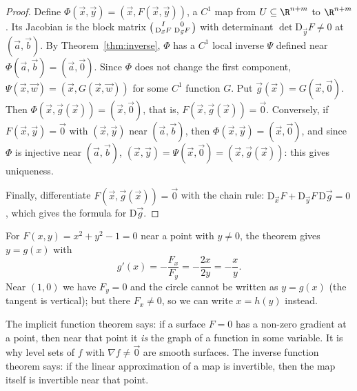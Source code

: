 \begin{proof}
Define $\Phi(\vec x,\vec y)=(\vec x,F(\vec x,\vec y))$, a $C^1$ map from $U\subseteq\R^{n+m}$ to $\R^{n+m}$. Its Jacobian is the block matrix $\begin{psmallmatrix}I&0\\\mathrm{D}_{\vec x}F&\mathrm{D}_{\vec y}F\end{psmallmatrix}$ with determinant $\det\mathrm{D}_{\vec y}F\neq0$ at $(\vec a,\vec b)$. By Theorem~\ref{thm:inverse}, $\Phi$ has a $C^1$ local inverse $\Psi$ defined near $\Phi(\vec a,\vec b)=(\vec a,\vec 0)$. Since $\Phi$ does not change the first component, $\Psi(\vec x,\vec w)=(\vec x,G(\vec x,\vec w))$ for some $C^1$ function $G$. Put $\vec g(\vec x)=G(\vec x,\vec 0)$. Then $\Phi(\vec x,\vec g(\vec x))=(\vec x,\vec 0)$, that is, $F(\vec x,\vec g(\vec x))=\vec 0$. Conversely, if $F(\vec x,\vec y)=\vec 0$ with $(\vec x,\vec y)$ near $(\vec a,\vec b)$, then $\Phi(\vec x,\vec y)=(\vec x,\vec 0)$, and since $\Phi$ is injective near $(\vec a,\vec b)$, $(\vec x,\vec y)=\Psi(\vec x,\vec 0)=(\vec x,\vec g(\vec x))$: this gives uniqueness.

Finally, differentiate $F(\vec x,\vec g(\vec x))=\vec 0$ with the chain rule: $\mathrm{D}_{\vec x}F+\mathrm{D}_{\vec y}F\,\mathrm{D}\vec g=0$, which gives the formula for $\mathrm{D}\vec g$.
\end{proof}

\begin{example}
For $F(x,y)=x^2+y^2-1=0$ near a point with $y\ne0$, the theorem gives $y=g(x)$ with
\[
g'(x)=-\frac{F_x}{F_y}=-\frac{2x}{2y}=-\frac xy .
\]
Near $(1,0)$ we have $F_y=0$ and the circle cannot be written as $y=g(x)$ (the tangent is vertical); but there $F_x\neq0$, so we can write $x=h(y)$ instead.
\end{example}

\begin{intuition}
The implicit function theorem says: if a surface $F=0$ has a non-zero gradient at a point, then near that point it \emph{is} the graph of a function in some variable. It is why level sets of $f$ with $\nabla f\neq\vec0$ are smooth surfaces. The inverse function theorem says: if the linear approximation of a map is invertible, then the map itself is invertible near that point.
\end{intuition}

